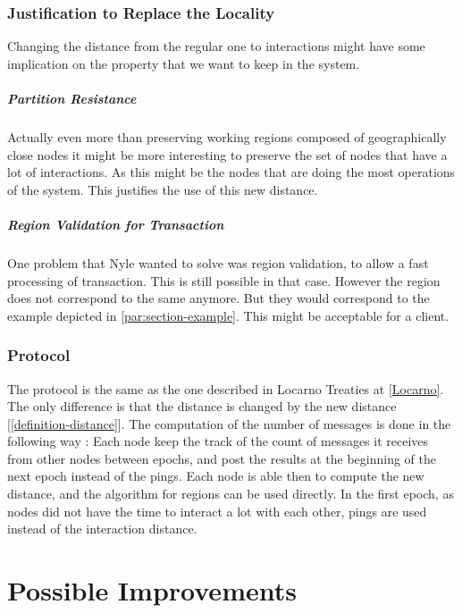 \documentclass[a4paper,11pt,oneside]{report}
\begin{document}
\subsection{Justification to Replace the Locality}
Changing the distance from the regular one to interactions might have some
implication on the property that we want to keep in the system. 

\paragraph{Partition Resistance}
Actually even more than preserving working regions
composed of geographically close nodes it might be more interesting to preserve
the set of nodes that have a lot of interactions. As this might be the nodes
that are doing the most operations of the system. This justifies the use of
this new distance.

\paragraph{Region Validation for Transaction}
One problem that Nyle wanted to solve was region validation, to allow a fast
processing of transaction. This is still possible in that case. However the
region does not correspond to the same anymore. But they would correspond to
the example depicted in \autoref{par:section-example}. This might be acceptable
for a client. 

\subsection{Protocol}
The protocol is the same as the one described in Locarno Treaties at
\autoref{Locarno}. The only difference is that the distance is changed by the
new distance [\autoref{definition-distance}]. The computation of the number of
messages is done in the following way : Each node keep the track of the count
of messages it receives from other nodes between epochs, and post the results
at the beginning of the next epoch instead of the pings. Each node is able then
to compute the new distance, and the algorithm for regions can be used
directly. In the first epoch, as nodes did not have the time to interact a lot
with each other, pings are used instead of the interaction distance.


\chapter{Possible Improvements} \label{chap:Possible Improvements} %
\end{document}
